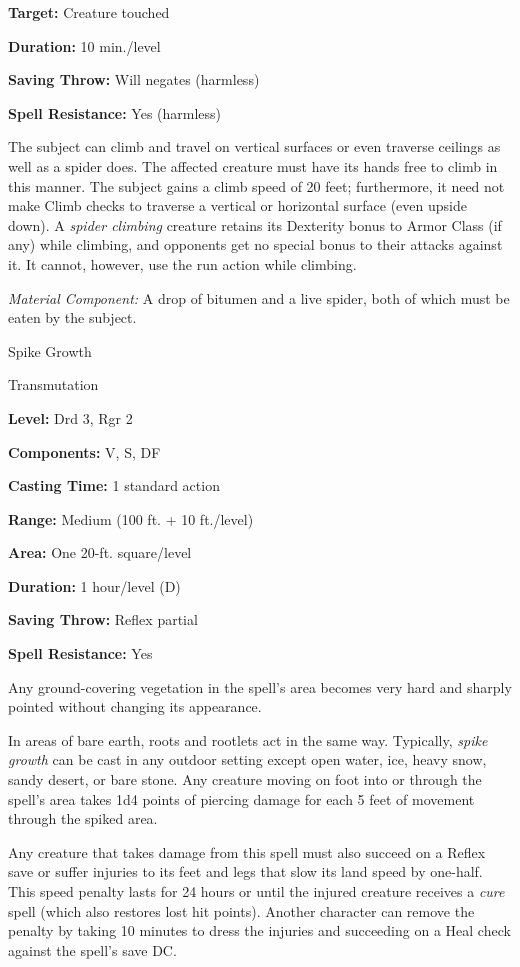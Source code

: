 \documentclass{article}
\begin{document}
\textbf{Target:} Creature touched

\textbf{Duration:} 10 min./level

\textbf{Saving Throw: }Will negates (harmless)

\textbf{Spell Resistance:} Yes (harmless)

The subject can climb and travel on vertical surfaces or even traverse ceilings 
as well as a spider does. The affected creature must have its hands free to climb 
in this manner. The subject gains a climb speed of 20 feet; furthermore, it need 
not make Climb checks to traverse a vertical or horizontal surface (even upside 
down). A \textit{spider climbing }creature retains its Dexterity bonus to Armor 
Class (if any) while climbing, and opponents get no special bonus to their attacks 
against it. It cannot, however, use the run action while climbing.

\textit{Material Component: }A drop of bitumen and a live spider, both of which 
must be eaten by the subject.

\vspace{12pt}
Spike Growth

Transmutation

\textbf{Level:} Drd 3, Rgr 2

\textbf{Components:} V, S, DF

\textbf{Casting Time:} 1 standard action

\textbf{Range: }Medium (100 ft. + 10 ft./level)

\textbf{Area:} One 20-ft. square/level

\textbf{Duration:} 1 hour/level (D)

\textbf{Saving Throw:} Reflex partial

\textbf{Spell Resistance:} Yes

Any ground-covering vegetation in the spell's area becomes very hard and sharply 
pointed without changing its appearance.

In areas of bare earth, roots and rootlets act in the same way. Typically, \textit{spike 
growth }can be cast in any outdoor setting except open water, ice, heavy snow, 
sandy desert, or bare stone. Any creature moving on foot into or through the spell's 
area takes 1d4 points of piercing damage for each 5 feet of movement through the 
spiked area.

Any creature that takes damage from this spell must also succeed on a Reflex save 
or suffer injuries to its feet and legs that slow its land speed by one-half. This 
speed penalty lasts for 24 hours or until the injured creature receives a \textit{cure 
}spell (which also restores lost hit points). Another character can remove the 
penalty by taking 10 minutes to dress the injuries and succeeding on a Heal check 
against the spell's save DC.
\end{document}
